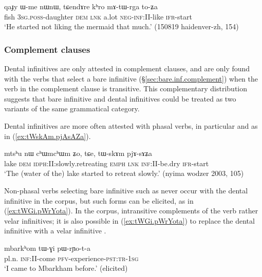 \begin{exe}
\ex  \label{ex:mAtWrga}
\gll qaɟy ɯ-me nɯnɯ, tɕendɤre kʰro mɤ-tɯ-rga to-ʑa\\
fish \textsc{3sg.poss}-daughter \textsc{dem} \textsc{lnk} a.lot \textsc{neg-inf:II}-like \textsc{ifr}-start \\
\glt `He started not liking the mermaid that much.' (150819 haidenver-zh, 154)
\end{exe}


\subsubsection{Complement clauses} \label{sec:dental.inf.complement}
Dental  infinitives are only attested in complement clauses, and are only found with the verbs that select a bare infinitive (§\ref{sec:bare.inf.complement}) when the verb in the complement clause is transitive. This complementary distribution suggests that bare infinitive and dental infinitives could be treated as two variants of the same grammatical category.

Dental infinitives are more often attested with phasal verbs, in particular  and  as in (\ref{ex:tWskAm.pjAsAZa}).

\begin{exe}
\ex \label{ex:tWskAm.pjAsAZa}
\gll mtsʰu nɯ cʰɯmcʰɯm ʑo, tɕe, tɯ-skɤm pjɤ-sɤʑa \\
lake \textsc{dem} \textsc{idph}:II:slowly.retreating \textsc{emph} \textsc{lnk} \textsc{inf}:II-be.dry \textsc{ifr}-start \\
\glt `The (water of the) lake started to retreat slowly.' (nyima wodzer 2003, 105)
\end{exe}

Non-phasal verbs selecting bare infinitive such as  never occur with the dental infinitive in the corpus, but such forms can be elicited, as in (\ref{ex:tWGi.pWrYota}). In the corpus, intransitive complements of the verb  rather velar infinitives; it is also possible  in (\ref{ex:tWGi.pWrYota}) to replace the dental infinitive  with a velar infinitive .

\begin{exe}
\ex \label{ex:tWGi.pWrYota}
\gll  mbarkʰom tɯ-ɣi pɯ-rɲo-t-a  \\
pl.n. \textsc{inf}:II-come \textsc{pfv}-experience-\textsc{pst}:\textsc{tr}-\textsc{1sg} \\
\glt `I came to Mbarkham before.' (elicited)
\end{exe}

